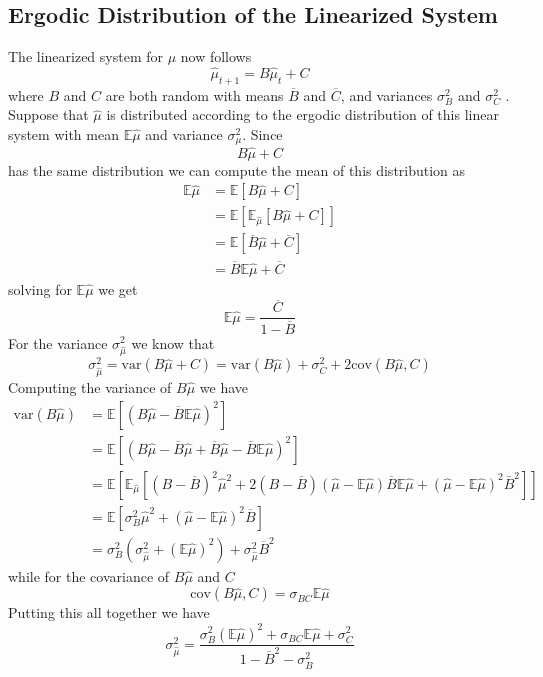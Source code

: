 \documentclass[12pt]{article}
\newcommand{\EE}{\mathbb E}
\newcommand{\barB}{{\overline B}}
\newcommand{\barC}{{\overline C}}
\newcommand{\var}{{\text{var}}}
\newcommand{\cov}{{\text{cov}}}
\begin{document}
\subsection{Ergodic Distribution of the Linearized System}
The linearized system for $\mu$ now follows
\[
	\hat \mu_{t+1} = B \hat\mu_t + C
\]  where $B$ and $C$ are both random with means $\barB$ and $\barC$, and variances $\sigma_B^2$ and $\sigma_C^2$ .  Suppose that $\hat\mu$ is distributed according to the ergodic distribution of this linear system with mean $\EE\hat\mu$ and variance $\sigma^2_\mu$.  Since 
\[
	B\hat\mu +C
\]has the same distribution we can compute the mean of this distribution as
\[
\begin{split}
	\EE\hat\mu &= \EE\left[ B\hat\mu+C\right]\\
			  &= \EE\left[\EE_{\hat\mu}\left[B\hat\mu+C\right]\right]\\
			  &= \EE\left[\barB\hat\mu +\barC\right]\\
			  &=\barB\EE\hat\mu+\barC
\end{split}
\]solving for $\EE\hat\mu$ we get
\begin{equation}
	\EE\hat\mu = \frac{\barC}{1-\barB}
\end{equation}For the variance $\sigma^2_{\hat\mu}$ we know that 
\[
	\sigma^2_{\hat\mu} = \var(B\hat\mu+C) = \var(B\hat\mu) + \sigma_C^2 + 2\cov(B\hat\mu,C)
\]Computing the variance of $B\hat \mu$ we have
\[
\begin{split}
	\var(B\hat\mu) &=\EE\left[(B\hat\mu - \barB\EE\hat\mu)^2\right]\\
			       &=\EE\left[(B\hat\mu-\barB\hat\mu +\barB\hat\mu -\barB\EE\hat\mu)^2\right]\\
			      &=\EE\left[\EE_{\hat\mu}\left[(B-\barB)^2\hat\mu^2 +2(B-\barB)(\hat\mu-\EE\hat\mu)\barB\EE\hat\mu + (\hat\mu-\EE\hat\mu)^2\bar B^2\right]\right]\\
			&=\EE\left[\sigma_B^2\hat\mu^2 +(\hat\mu-\EE\hat\mu)^2\barB\right]\\
			& = \sigma_B^2(\sigma_{\hat\mu}^2+(\EE\hat\mu)^2) + \sigma_{\hat\mu}^2\barB^2
\end{split}
\]while for the covariance of $B\hat\mu$ and $C$
\[
	\cov(B\hat\mu,C) = \sigma_{BC}\EE\hat\mu
\]Putting this all together we have
\begin{equation}
	\sigma_{\hat\mu}^2 = \frac{\sigma_B^2(\EE\hat\mu)^2 + \sigma_{BC}\EE\hat\mu + \sigma_C^2}{1-\barB^2-\sigma_B^2}
\end{equation}
\end{document}

